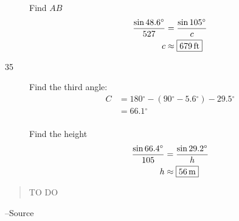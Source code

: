 \documentclass{exam}
\newcommand{\dg}{\ensuremath{^\circ}}
\begin{document}
\begin{description}
        Find $AB$
        \begin{align*}
          \frac{\sin 48.6 \dg}{527} & = \frac{\sin 105 \dg}{c} \\
          c                         & \approx \boxed{ \unit[679]{ft} } \\
        \end{align*}

      \item[35] 
        Find the third angle:
        \begin{align*}
          C & = 180 \dg - (90 \dg - 5.6 \dg) - 29.5 \dg \\
            & = 66.1 \dg \\
        \end{align*}

        Find the height
        \begin{align*}
          \frac{\sin 66.4 \dg}{105} & = \frac{\sin 29.2 \dg}{h} \\
          h                         & \approx \boxed{ \unit[56]{m} } \\
        \end{align*}
    \end{description}

  \else
    \vspace{1 cm}
    \begin{quote}
      \begin{em}
        TO DO
      \end{em}
    \end{quote}
    \hspace{1 cm} --Source
  \fi
\end{document}
